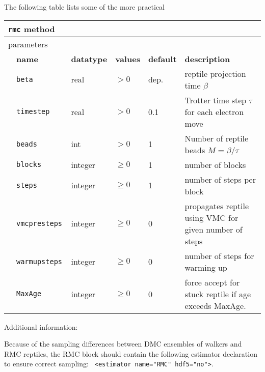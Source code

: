 The following table lists some of the more practical 
\begin{table}[h]
\begin{center}
\begin{tabularx}{\textwidth}{l l l l l X }
\hline
\multicolumn{6}{l}{\texttt{rmc} method} \\
\hline
\multicolumn{2}{l}{parameters}  & \multicolumn{4}{l}{}\\
   &   \bfseries name     & \bfseries datatype & \bfseries values & \bfseries default   & \bfseries description \\
   &   \texttt{beta            } &  real  & $> 0$ & dep.   & reptile projection time $\beta$  \\
   &   \texttt{timestep            } &  real     & $> 0$ & 0.1 & Trotter time step $\tau$ for each electron move \\
   &   \texttt{beads           } &  int     & $> 0$ & 1 & Number of reptile beads $M=\beta/\tau$ \\
   &   \texttt{blocks              } &  integer  & $\ge 0$ & 1   & number of blocks            \\
   &   \texttt{steps               } &  integer  & $\ge 0$ & 1   & number of steps per block   \\
   &   \texttt{vmcpresteps        } &  integer  & $\ge 0$ & 0   & propagates reptile using VMC for given number of steps\\
   &   \texttt{warmupsteps         } &  integer  & $\ge 0$ & 0   & number of steps for warming up\\
   &   \texttt{MaxAge              }   & integer & $\ge 0 $   & 0   & force accept for stuck reptile if age exceeds MaxAge. \\
  \hline
\end{tabularx}
\end{center}
\end{table}

Additional information:

Because of the sampling differences between DMC ensembles of walkers and RMC reptiles, the RMC block should contain the following estimator declaration to ensure correct sampling:  \texttt{ <estimator name="RMC" hdf5="no">}. 
  
